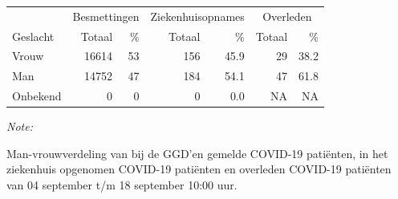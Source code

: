 \documentclass[
  english,
  man,floatsintext]{apa6}
\begin{document}
\begin{table}
\centering\begingroup\fontsize{11}{13}\selectfont

\begin{threeparttable}
\begin{tabular}{lrrrrrr}
\toprule
\multicolumn{1}{c}{ } & \multicolumn{2}{c}{Besmettingen} & \multicolumn{2}{c}{Ziekenhuisopnames} & \multicolumn{2}{c}{Overleden} \\
\cmidrule(l{3pt}r{3pt}){2-3} \cmidrule(l{3pt}r{3pt}){4-5} \cmidrule(l{3pt}r{3pt}){6-7}
Geslacht & Totaal & \% & Totaal & \% & Totaal & \%\\
\midrule
Vrouw & 16614 & 53 & 156 & 45.9 & 29 & 38.2\\
Man & 14752 & 47 & 184 & 54.1 & 47 & 61.8\\
Onbekend & 0 & 0 & 0 & 0.0 & NA & NA\\
\bottomrule
\end{tabular}
\begin{tablenotes}
\item \textit{Note: } 
\item Man-vrouwverdeling van bij de GGD’en gemelde COVID-19 patiënten, in het ziekenhuis opgenomen COVID-19 patiënten en overleden COVID-19 patiënten van 04 september t/m 18 september 10:00 uur.
\end{tablenotes}
\end{threeparttable}
\endgroup{}
\end{table}
\newpage
\end{document}

